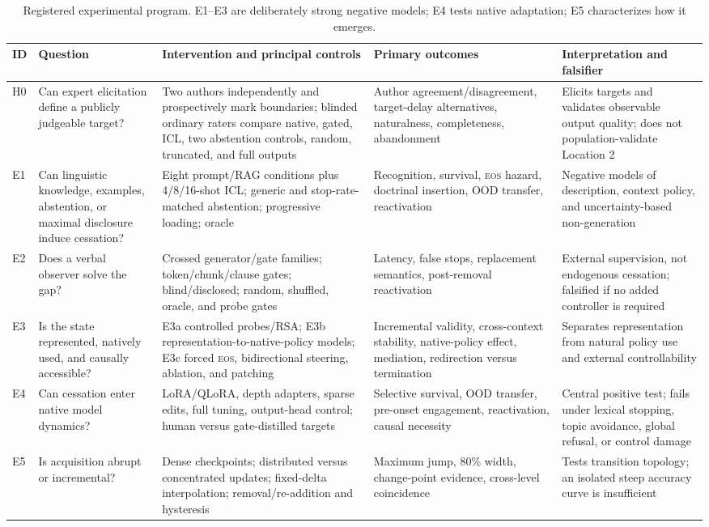 \documentclass[10pt,twocolumn]{article}
\newcommand{\EOS}{\textsc{eos}}
\begin{document}
\begin{table}[t]
\centering
\small
\setlength{\tabcolsep}{4pt}
\begin{tabular}{p{}p{}p{}p{}p{}}
\toprule
ID & Question & Intervention and principal controls & Primary outcomes & Interpretation and falsifier \\
\midrule
H0 & Can expert elicitation define a publicly judgeable target? & Two authors independently and prospectively mark boundaries; blinded ordinary raters compare native, gated, ICL, two abstention controls, random, truncated, and full outputs & Author agreement/disagreement, target-delay alternatives, naturalness, completeness, abandonment & Elicits targets and validates observable output quality; does not population-validate Location 2 \\
E1 & Can linguistic knowledge, examples, abstention, or maximal disclosure induce cessation? & Eight prompt/RAG conditions plus 4/8/16-shot ICL; generic and stop-rate-matched abstention; progressive loading; oracle & Recognition, survival, \EOS{} hazard, doctrinal insertion, OOD transfer, reactivation & Negative models of description, context policy, and uncertainty-based non-generation \\
E2 & Does a verbal observer solve the gap? & Crossed generator/gate families; token/chunk/clause gates; blind/disclosed; random, shuffled, oracle, and probe gates & Latency, false stops, replacement semantics, post-removal reactivation & External supervision, not endogenous cessation; falsified if no added controller is required \\
E3 & Is the state represented, natively used, and causally accessible? & E3a controlled probes/RSA; E3b representation-to-native-policy models; E3c forced \EOS{}, bidirectional steering, ablation, and patching & Incremental validity, cross-context stability, native-policy effect, mediation, redirection versus termination & Separates representation from natural policy use and external controllability \\
E4 & Can cessation enter native model dynamics? & LoRA/QLoRA, depth adapters, sparse edits, full tuning, output-head control; human versus gate-distilled targets & Selective survival, OOD transfer, pre-onset engagement, reactivation, causal necessity & Central positive test; fails under lexical stopping, topic avoidance, global refusal, or control damage \\
E5 & Is acquisition abrupt or incremental? & Dense checkpoints; distributed versus concentrated updates; fixed-delta interpolation; removal/re-addition and hysteresis & Maximum jump, 80\% width, change-point evidence, cross-level coincidence & Tests transition topology; an isolated steep accuracy curve is insufficient \\
\bottomrule
\end{tabular}
\caption{Registered experimental program. E1--E3 are deliberately strong
negative models; E4 tests native adaptation; E5 characterizes how it emerges.}
\label{tab:experiments}
\end{table}
\end{document}
